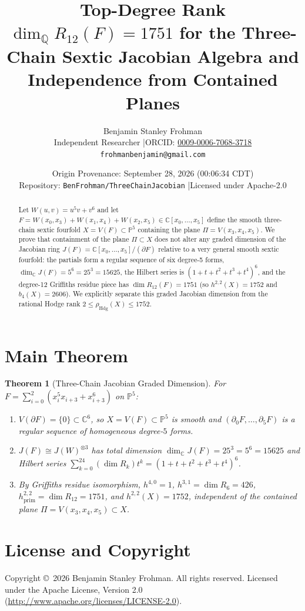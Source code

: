 \documentclass[11pt]{article}
\title{\textbf{Top-Degree Rank $\dim_{\mathbb{Q}} R_{12}(F) = 1751$ for the Three-Chain Sextic Jacobian Algebra and Independence from Contained Planes}}
\author{Benjamin Stanley Frohman\\
\small Independent Researcher \quad|\quad ORCID: \href{https://orcid.org/0009-0006-7068-3718}{0009-0006-7068-3718}\\
\small \texttt{frohmanbenjamin@gmail.com}}
\date{Origin Provenance: September 28, 2026 (00:06:34 CDT) \\ \small Repository: \texttt{BenFrohman/ThreeChainJacobian} \quad|\quad Licensed under Apache-2.0}
\newtheorem{theorem}{Theorem}
\begin{document}
\maketitle

\begin{abstract}
Let $W(u,v) = u^5v + v^6$ and let $F = W(x_0,x_3) + W(x_1,x_4) + W(x_2,x_5) \in \mathbb{C}[x_0,\dots,x_5]$ define the smooth three-chain sextic fourfold $X = V(F) \subset \mathbb{P}^5$ containing the plane $\Pi = V(x_3,x_4,x_5)$. We prove that containment of the plane $\Pi \subset X$ does not alter any graded dimension of the Jacobian ring $J(F) = \mathbb{C}[x_0,\dots,x_5]/(\partial F)$ relative to a very general smooth sextic fourfold: the partials form a regular sequence of six degree-5 forms, $\dim_{\mathbb{C}} J(F) = 5^6 = 25^3 = 15625$, the Hilbert series is $(1+t+t^2+t^3+t^4)^6$, and the degree-12 Griffiths residue piece has $\dim R_{12}(F) = 1751$ (so $h^{2,2}(X) = 1752$ and $b_4(X) = 2606$). We explicitly separate this graded Jacobian dimension from the rational Hodge rank $2 \le \rho_{\mathrm{Hdg}}(X) \le 1752$.
\end{abstract}

\section{Main Theorem}
\begin{theorem}[Three-Chain Jacobian Graded Dimension]
For $F = \sum_{i=0}^2 (x_i^5 x_{i+3} + x_{i+3}^6)$ on $\mathbb{P}^5$:
\begin{enumerate}
  \item $V(\partial F) = \{0\} \subset \mathbb{C}^6$, so $X = V(F) \subset \mathbb{P}^5$ is smooth and $(\partial_0 F, \dots, \partial_5 F)$ is a regular sequence of homogeneous degree-$5$ forms.
  \item $J(F) \cong J(W)^{\otimes 3}$ has total dimension $\dim_{\mathbb{C}} J(F) = 25^3 = 5^6 = 15625$ and Hilbert series $\sum_{k=0}^{24} (\dim R_k) t^k = (1+t+t^2+t^3+t^4)^6$.
  \item By Griffiths residue isomorphism, $h^{4,0}=1$, $h^{3,1}=\dim R_6 = 426$, $h^{2,2}_{\mathrm{prim}} = \dim R_{12} = 1751$, and $h^{2,2}(X) = 1752$, independent of the contained plane $\Pi = V(x_3,x_4,x_5) \subset X$.
\end{enumerate}
\end{theorem}

\section*{License and Copyright}
Copyright \copyright\ 2026 Benjamin Stanley Frohman. All rights reserved. Licensed under the Apache License, Version 2.0 (\url{http://www.apache.org/licenses/LICENSE-2.0}).
\end{document}
